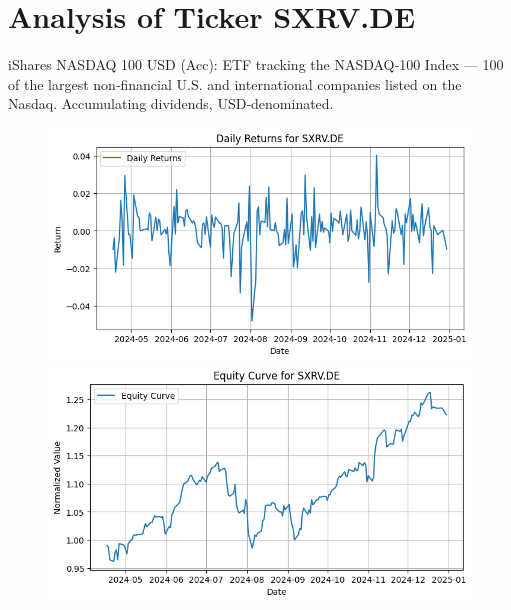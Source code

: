 \documentclass{article}%
\begin{document}
%
\newpage

%
\section*{Analysis of Ticker SXRV.DE}%
\label{sec:AnalysisofTickerSXRV.DE}%
iShares NASDAQ 100 USD (Acc): ETF tracking the NASDAQ‑100 Index — 100 of the largest non‑financial U.S. and international companies listed on the Nasdaq. Accumulating dividends, USD‑denominated.%


\begin{figure}[htbp]%
\begin{minipage}{0.49\textwidth}%
\includegraphics[width=\linewidth]{ticker_images/SXRV.DE_daily_returns.png}%
\end{minipage}%
\begin{minipage}{0.49\textwidth}%
\includegraphics[width=\linewidth]{ticker_images/SXRV.DE_equity_curve.png}%
\end{minipage}%
\end{figure}

%
\end{document}
